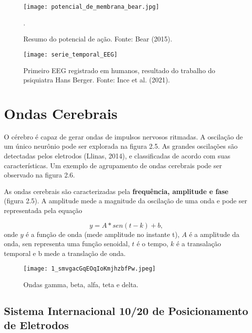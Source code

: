\begin{figure}[!h]
    \centering
    \texttt{[image: potencial\_de\_membrana\_bear.jpg]}
    \caption[Impulsos nervosos conduzidos em neurônios]{Resumo do potencial de ação. Fonte: Bear (2015).}.\label{fig:potencial}
    \end{figure}


  \begin{figure}[h]
    \centering
    \texttt{[image: serie\_temporal\_EEG]}
    \caption[]{Primeiro EEG registrado em humanos, resultado do trabalho do psiquiatra Hans Berger. Fonte: Ince et al. (2021).} 
    \end{figure}

\section{Ondas Cerebrais}

O cérebro é capaz de gerar ondas de impulsos nervosos ritmadas. A oscilação de um único neurônio pode ser explorada na figura 2.5. As grandes oscilações são detectadas pelos eletrodos (Llinas, 2014), e classificadas de acordo com suas características. Um exemplo de agrupamento de ondas cerebrais pode ser observado na figura 2.6. 


As ondas cerebrais são caracterizadas pela \textbf{frequência, amplitude e fase} (figura 2.5). 
A amplitude mede a magnitude da oscilação de uma onda e pode ser representada pela equação

\begin{equation}
    y = A * sen (t - k) + b,
\end{equation}
onde $y$ é a função de onda (mede amplitude no instante t), $A$ é a amplitude da onda, sen representa
uma função senoidal, $t$ é o tempo, $k$ é a transalação temporal e b mede a translação de onda. 


\begin{figure}[h]
    \centering
    \texttt{[image: 1\_smvgacGqEOqIoKmjhzbfPw.jpeg]}
    \caption[]{Ondas gamma, beta, alfa, teta e delta.} 
    \end{figure}


\subsection{Sistema Internacional 10/20 de Posicionamento de Eletrodos} 

